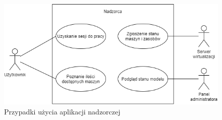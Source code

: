 \documentclass[../praca-dyplomowa.tex]{subfiles}
\begin{document}
\begin{figure}[H]
    \centering
    \includegraphics[width=\textwidth]{../diagrams/use_cases/overseer.png}
    \caption{Przypadki użycia aplikacji nadzorczej}
\end{figure}
\end{document}
